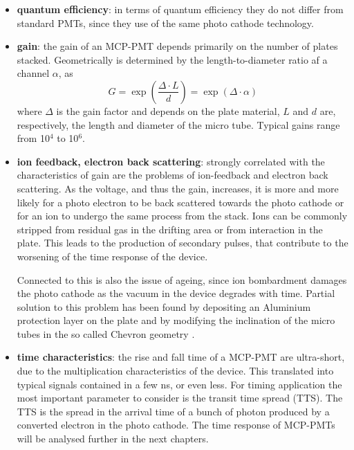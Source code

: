 \begin{itemize}
\item \textbf{quantum efficiency}: in terms of quantum efficiency they do not differ from standard PMTs, since they use of the same photo cathode technology.
\item \textbf{gain}: the gain of an MCP-PMT depends primarily on the number of plates stacked. Geometrically is determined by the length-to-diameter ratio af a channel $\alpha$, as
\begin{equation}
G = \exp{\left( \frac{\Delta \cdot L}{d} \right)} = \exp{\left( \Delta \cdot \alpha \right)}
\end{equation}
where $\Delta$ is the gain factor and depends on the plate material, $L$ and $d$ are, respectively, the length and diameter of the micro tube.
Typical gains range from 10$^{4}$ to 10$^{6}$.
\item \textbf{ion feedback, electron back scattering}: strongly correlated with the characteristics of gain are the problems of ion-feedback and electron back scattering. As the voltage, and thus the gain, increases, it is more and more likely for a photo electron to be back scattered towards the photo cathode or for an ion to undergo the same process from the stack. Ions can be commonly stripped from residual gas in the drifting area or from interaction in the plate.
This leads to the production of secondary pulses, that contribute to the worsening of the time response of the device.

Connected to this is also the issue of ageing, since ion bombardment damages the photo cathode as the vacuum in the device degrades with time.
Partial solution to this problem has been found by depositing an Aluminium protection layer on the plate and by modifying the inclination of the micro tubes in the so called Chevron geometry \cite{Vavra2004}.

\item \textbf{time characteristics}: the rise and fall time of a MCP-PMT are ultra-short, due to the multiplication characteristics of the device. This translated into typical signals contained in a few ns, or even less. For timing application the most important parameter to consider is the transit time spread (TTS). The TTS is the spread in the arrival time of a bunch of photon produced by a converted electron in the photo cathode. The time response of MCP-PMTs will be analysed further in the next chapters.

\end{itemize}

